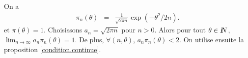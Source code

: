 \begin{rep} %
On a
\begin{eqnarray*}
\pi_n(\theta) & = & \frac{1}{\sqrt{2\pi n}}\exp\left(-\theta^2/2n\right).
\end{eqnarray*}
et $\pi(\theta)=1$. 
Choisissons $a_n=\sqrt{2\pi n}$ pour $n>0$. Alors pour tout $\theta\in I\!\!N$, $\lim_{n\to\infty} a_n \pi_n(\theta) = 1$. De plus, $\forall (n,\theta)$, $a_n\pi_n(\theta)<2$. On utilise ensuite la proposition \ref{condition.continue}.  
\end{rep}